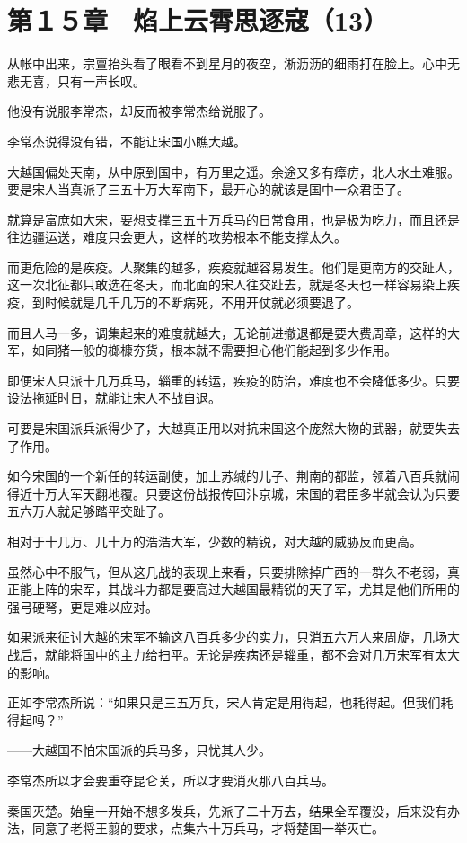 \section{第１５章　焰上云霄思逐寇（13）}

从帐中出来，宗亶抬头看了眼看不到星月的夜空，淅沥沥的细雨打在脸上。心中无悲无喜，只有一声长叹。

他没有说服李常杰，却反而被李常杰给说服了。

李常杰说得没有错，不能让宋国小瞧大越。

大越国偏处天南，从中原到国中，有万里之遥。余途又多有瘴疠，北人水土难服。要是宋人当真派了三五十万大军南下，最开心的就该是国中一众君臣了。

就算是富庶如大宋，要想支撑三五十万兵马的日常食用，也是极为吃力，而且还是往边疆运送，难度只会更大，这样的攻势根本不能支撑太久。

而更危险的是疾疫。人聚集的越多，疾疫就越容易发生。他们是更南方的交趾人，这一次北征都只敢选在冬天，而北面的宋人往交趾去，就是冬天也一样容易染上疾疫，到时候就是几千几万的不断病死，不用开仗就必须要退了。

而且人马一多，调集起来的难度就越大，无论前进撤退都是要大费周章，这样的大军，如同猪一般的榔槺夯货，根本就不需要担心他们能起到多少作用。

即便宋人只派十几万兵马，辎重的转运，疾疫的防治，难度也不会降低多少。只要设法拖延时日，就能让宋人不战自退。

可要是宋国派兵派得少了，大越真正用以对抗宋国这个庞然大物的武器，就要失去了作用。

如今宋国的一个新任的转运副使，加上苏缄的儿子、荆南的都监，领着八百兵就闹得近十万大军天翻地覆。只要这份战报传回汴京城，宋国的君臣多半就会认为只要五六万人就足够踏平交趾了。

相对于十几万、几十万的浩浩大军，少数的精锐，对大越的威胁反而更高。

虽然心中不服气，但从这几战的表现上来看，只要排除掉广西的一群久不老弱，真正能上阵的宋军，其战斗力都是要高过大越国最精锐的天子军，尤其是他们所用的强弓硬弩，更是难以应对。

如果派来征讨大越的宋军不输这八百兵多少的实力，只消五六万人来周旋，几场大战后，就能将国中的主力给扫平。无论是疾病还是辎重，都不会对几万宋军有太大的影响。

正如李常杰所说：“如果只是三五万兵，宋人肯定是用得起，也耗得起。但我们耗得起吗？”

——大越国不怕宋国派的兵马多，只忧其人少。

李常杰所以才会要重夺昆仑关，所以才要消灭那八百兵马。

秦国灭楚。始皇一开始不想多发兵，先派了二十万去，结果全军覆没，后来没有办法，同意了老将王翦的要求，点集六十万兵马，才将楚国一举灭亡。

